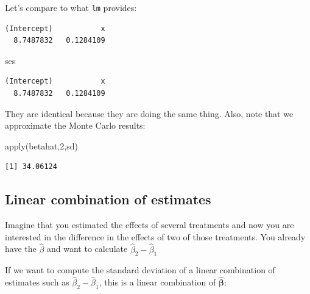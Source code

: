 \documentclass[
  letterpaper,
  DIV=11,
  numbers=noendperiod]{scrartcl}
\newenvironment{Shaded}{\begin{snugshade}}{\end{snugshade}}
\newcommand{\DecValTok}[1]{\textcolor[rgb]{0.68,0.00,0.00}{#1}}
\newcommand{\FunctionTok}[1]{\textcolor[rgb]{0.28,0.35,0.67}{#1}}
\newcommand{\NormalTok}[1]{\textcolor[rgb]{0.00,0.23,0.31}{#1}}
\newcommand{\SpecialCharTok}[1]{\textcolor[rgb]{0.37,0.37,0.37}{#1}}
\begin{document}
Let's compare to what \texttt{lm} provides:

\begin{Shaded}
\end{Shaded}

\begin{verbatim}
(Intercept)           x 
  8.7487832   0.1284109 
\end{verbatim}

\begin{Shaded}
\begin{Highlighting}[]
\NormalTok{ses}
\end{Highlighting}
\end{Shaded}

\begin{verbatim}
(Intercept)           x 
  8.7487832   0.1284109 
\end{verbatim}

They are identical because they are doing the same thing. Also, note
that we approximate the Monte Carlo results:

\begin{Shaded}
\begin{Highlighting}[]
\FunctionTok{apply}\NormalTok{(betahat,}\DecValTok{2}\NormalTok{,sd)}
\end{Highlighting}
\end{Shaded}

\begin{verbatim}
[1] 34.06124
\end{verbatim}

\subsection{Linear combination of
estimates}\label{linear-combination-of-estimates}

Imagine that you estimated the effects of several treatments and now you
are interested in the difference in the effects of two of those
treatments. You already have the \(\hat{\beta}\) and want to calculate
\(\hat{\beta}_2-\hat{\beta}_1\)

If we want to compute the standard deviation of a linear combination of
estimates such as \(\hat{\beta}_2 - \hat{\beta}_1\), this is a linear
combination of \(\hat{\boldsymbol{\beta}}\):
\end{document}
